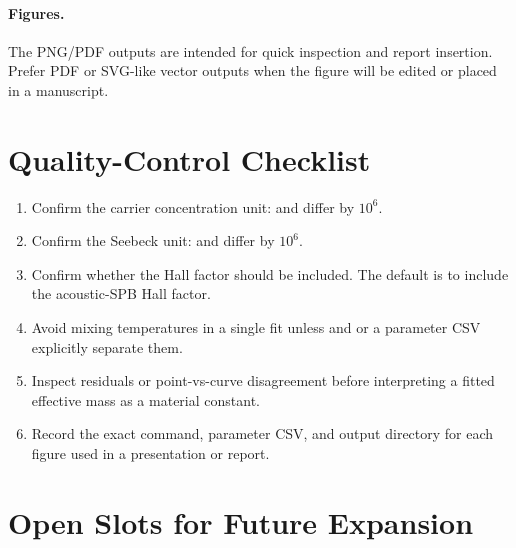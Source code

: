 \paragraph{Figures.}
The PNG/PDF outputs are intended for quick inspection and report insertion.
Prefer PDF or SVG-like vector outputs when the figure will be edited or placed
in a manuscript.

\section{Quality-Control Checklist}

\begin{enumerate}[leftmargin=*]
  \item Confirm the carrier concentration unit:  and 
  differ by $10^6$.
  \item Confirm the Seebeck unit:  and  differ by $10^6$.
  \item Confirm whether the Hall factor should be included. The default is to
  include the acoustic-SPB Hall factor.
  \item Avoid mixing temperatures in a single fit unless  and
   or a parameter CSV explicitly separate them.
  \item Inspect residuals or point-vs-curve disagreement before interpreting a
  fitted effective mass as a material constant.
  \item Record the exact command, parameter CSV, and output directory for each
  figure used in a presentation or report.
\end{enumerate}

\section{Open Slots for Future Expansion}



